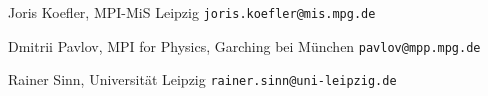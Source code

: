 \documentclass[12pt]{extarticle}
\theoremstyle{definition}
\theoremstyle{theorem}
\theoremstyle{remark}
\numberwithin{equation}{section}
\begin{document}
\printbibliography

\medskip

\noindent Joris Koefler, MPI-MiS Leipzig
\hfill {\tt joris.koefler@mis.mpg.de}

\noindent Dmitrii Pavlov, MPI for Physics, Garching bei M\"unchen
\hfill {\tt pavlov@mpp.mpg.de}

\noindent Rainer Sinn, Universit\"at Leipzig
\hfill {\tt rainer.sinn@uni-leipzig.de}
\end{document}
